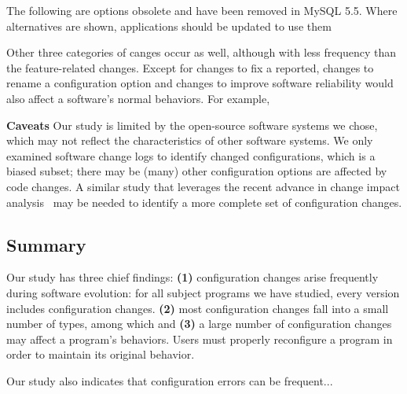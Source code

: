 The following are options obsolete and have been removed in
MySQL 5.5. Where alternatives are shown, applications should
be updated to use them

Other three categories of canges occur as well, although
with less frequency than the feature-related changes.
Except for changes to fix a reported, changes to rename
a configuration option and changes to improve
software reliability would also affect a
software's normal behaviors. For example,




\vspace{1mm}
\noindent\textbf{Caveats}
Our study is limited by the open-source
software systems we chose, which may not reflect
the characteristics of other software systems.
We only examined software change logs to identify
changed configurations, which is a biased
subset; there may be (many) other configuration
options are affected by code changes. A similar
study that leverages the recent advance in
change impact analysis~\cite{} may be needed
to identify a more complete set of
configuration changes.



\subsection{Summary}

Our study has three chief findings:
\textbf{(1)} configuration
changes arise frequently during software evolution: for
all subject programs we have studied, every version
includes configuration changes. \textbf{(2)} most configuration
changes fall into a small number of types, among
which 
and \textbf{(3)} a large number of
configuration changes may affect a program's
behaviors. Users must properly reconfigure a
program in order to maintain its original behavior.

Our study also indicates that configuration errors
can be frequent... 
